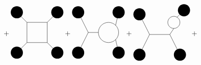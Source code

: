 \begin{equation}
\begin{aligned}
       &+\begin{gathered}
            \begin{tikzpicture}
                \fill[black] (1,1) circle (0.3 cm);
                 \fill[black] (-1,1) circle (0.3 cm);
                 \fill[black] (-1,-1) circle (0.3cm);
                 \fill[black] (1,-1) circle (0.3 cm);
                 \draw (-0.5,0.5) -- (-0.5,0.5);
                 \draw (-0.5,-0.5) -- (-0.5,0.5);
                 \draw (-0.5,-0.5) -- (0.5,-0.5);
                 \draw (-0.5,0.5) -- (0.5,0.5);
                 \draw (0.5,0.5) -- (0.5,-0.5);
                 \draw (-1,1) -- (-0.5,0.5);
                 \draw (1,1) -- (0.5,0.5);
                 \draw (-1,-1) -- (-0.5,-0.5);
                 \draw (1,-1) -- (0.5,-0.5);
            \end{tikzpicture}
       \end{gathered}+
        \begin{gathered}
            \begin{tikzpicture}
                \fill[black] (1,1) circle (0.3 cm);
                 \fill[black] (-1,1) circle (0.3 cm);
                 \fill[black] (-1,-1) circle (0.3cm);
                 \fill[black] (1,-1) circle (0.3 cm);
                 \draw (0.5,0) circle (0.5 cm);
                 \draw (-0.5,0) -- (0,0);
                 \draw (-1,1) -- (-0.5,0);
                 \draw (1,1) -- (0.85,0.35);
                 \draw (-1,-1) -- (-0.5,0);
                 \draw (1,-1) -- (0.85,-0.35);
            \end{tikzpicture}
       \end{gathered}+
        \begin{gathered}
            \begin{tikzpicture}
                \fill[black] (1.2,1.2) circle (0.3 cm);
                 \fill[black] (-1,1) circle (0.3 cm);
                 \fill[black] (-1,-1) circle (0.3cm);
                 \fill[black] (1,-1) circle (0.3 cm);
                 \draw (-0.5,0) -- (0.5,0);
                 \draw (-1,1) -- (-0.5,0);
                 \draw (0.7,0.3) -- (0.5,0);
                 \draw (-1,-1) -- (-0.5,0);
                 \draw (1,-1) -- (0.5,0);
                 \draw (0.85,0.85) -- (1.2,1.2);
                 \draw (0.7,0.6) circle (0.3cm);
            \end{tikzpicture}
       \end{gathered}+
       \begin{gathered}
            \begin{tikzpicture}

\end{tikzpicture}
\end{gathered}
\end{aligned}
\end{equation}
